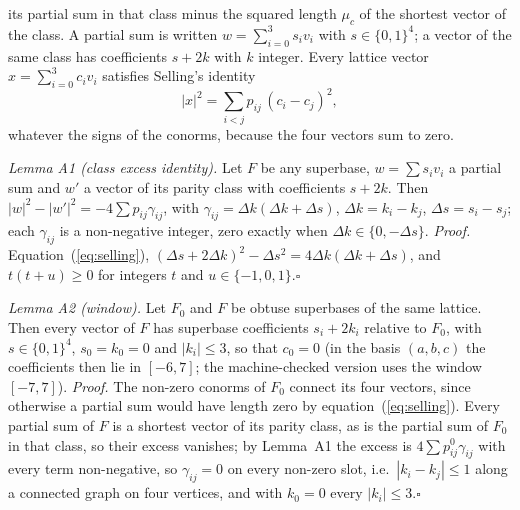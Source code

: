 \documentclass[preprint,pdf]{iucr}          %
\begin{document}
its partial sum in that class minus the squared length $\mu_c$ of the shortest vector of the class. A partial sum is written $w=\sum_{i=0}^3 s_iv_i$ with $s\in\{0,1\}^4$; a vector of the same class has coefficients $s+2k$ with $k$ integer. Every lattice vector $x=\sum_{i=0}^3 c_iv_i$ satisfies Selling's identity
\begin{equation}
|x|^2=\sum_{i<j}p_{ij}\,(c_i-c_j)^2 ,
\label{eq:selling}
\end{equation}
whatever the signs of the conorms, because the four vectors sum to zero.

\emph{Lemma A1 (class excess identity).} Let $F$ be any superbase, $w=\sum s_iv_i$ a partial sum and $w'$ a vector of its parity class with coefficients $s+2k$. Then $|w|^2-|w'|^2=-4\sum p_{ij}\gamma_{ij}$, with $\gamma_{ij}=\Delta k(\Delta k+\Delta s)$, $\Delta k=k_i-k_j$, $\Delta s=s_i-s_j$; each $\gamma_{ij}$ is a non-negative integer, zero exactly when $\Delta k\in\{0,-\Delta s\}$. \emph{Proof.} Equation~(\ref{eq:selling}), $(\Delta s+2\Delta k)^2-\Delta s^2=4\Delta k(\Delta k+\Delta s)$, and $t(t+u)\ge0$ for integers $t$ and $u\in\{-1,0,1\}$.\hfill$\square$

\emph{Lemma A2 (window).} Let $F_0$ and $F$ be obtuse superbases of the same lattice. Then every vector of $F$ has superbase coefficients $s_i+2k_i$ relative to $F_0$, with $s\in\{0,1\}^4$, $s_0=k_0=0$ and $|k_i|\le3$, so that $c_0=0$ (in the basis $(a,b,c)$ the coefficients then lie in $[-6,7]$; the machine-checked version uses the window $[-7,7]$). \emph{Proof.} The non-zero conorms of $F_0$ connect its four vectors, since otherwise a partial sum would have length zero by equation~(\ref{eq:selling}). Every partial sum of $F$ is a shortest vector of its parity class, as is the partial sum of $F_0$ in that class, so their excess vanishes; by Lemma~A1 the excess is $4\sum p^0_{ij}\gamma_{ij}$ with every term non-negative, so $\gamma_{ij}=0$ on every non-zero slot, i.e.\ $|k_i-k_j|\le1$ along a connected graph on four vertices, and with $k_0=0$ every $|k_i|\le3$.\hfill$\square$
\end{document}
